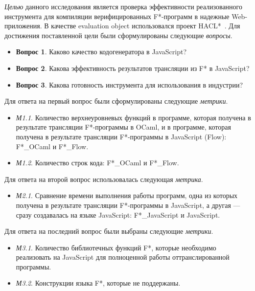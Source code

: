 \textit{Целью} данного исследования является проверка эффективности реализованного инструмента для компиляции верифицированных F*-программ в надежные Web-приложения. В качестве evaluation object использовался проект HACL*~\cite{hacl_star}. Для достижения поставленной цели были сформулированы следующие \textit{вопросы}.

\begin{itemize}
\item[] \textbf{Вопрос 1}. Каково качество кодогенератора в JavaScript?
\item[] \textbf{Вопрос 2}. Какова эффективность результатов трансляции из F* в JavaScript?
\item[] \textbf{Вопрос 3}. Какова готовность инструмента для использования в индустрии?
\end{itemize}

Для ответа на первый вопрос были сформулированы следующие \textit{метрики}.

\begin{itemize}
\item[] \textit{М1.1}. Количество верхнеуровневых функций в программе, которая получена в результате трансляции F*-программы в OCaml, и в программе, которая получена в результате трансляции F*-программы в JavaScript (Flow): F*\_OCaml и F*\_Flow.
\item[] \textit{М1.2}. Количество строк кода: F*\_OCaml и F*\_Flow.
\end{itemize}

Для ответа на второй вопрос использовалась следующая \textit{метрика}.

\begin{itemize}
\item[] \textit{М2.1}. Сравнение времени выполнения работы программ, одна из которых получена в результате трансляции F*-программы в JavaScript, а другая --- сразу создавалась на языке JavaScript: F*\_JavaScript и JavaScript.
\end{itemize}

Для ответа на последний вопрос были выбраны следующие \textit{метрики}.

\begin{itemize}
\item[] \textit{М3.1}. Количество библиотечных функций F*, которые необходимо реализовать на JavaScript для полноценной работы оттранслированной программы. 
\item[] \textit{М3.2}. Конструкции языка F*, которые не поддержаны.
\end{itemize}

